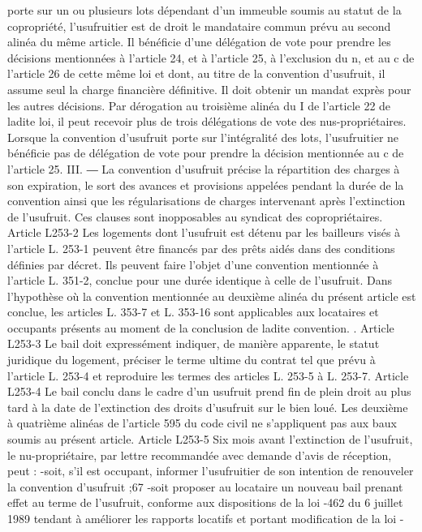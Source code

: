 \documentclass[11pt,a4paper]{report}
\begin{document}
porte sur un ou plusieurs lots dépendant d'un immeuble soumis au statut de la copropriété, l'usufruitier est de
droit le mandataire commun prévu au second alinéa du même article. Il bénéficie d'une délégation de vote pour
prendre les décisions mentionnées à l'article 24, et à l'article 25, à l'exclusion du n, et au c de l'article 26 de
cette même loi et dont, au titre de la convention d'usufruit, il assume seul la charge financière définitive. Il doit
obtenir un mandat exprès pour les autres décisions. Par dérogation au troisième alinéa du I de l'article 22 de
ladite loi, il peut recevoir plus de trois délégations de vote des nus-propriétaires. Lorsque la convention
d'usufruit porte sur l'intégralité des lots, l'usufruitier ne bénéficie pas de délégation de vote pour prendre la
décision mentionnée au c de l'article 25.
III. ― La convention d'usufruit précise la répartition des charges à son expiration, le sort des avances et
provisions appelées pendant la durée de la convention ainsi que les régularisations de charges intervenant après
l'extinction de l'usufruit. Ces clauses sont inopposables au syndicat des copropriétaires.
Article L253-2
Les logements dont l'usufruit est détenu par les bailleurs visés à l'article L. 253-1 peuvent être financés par des
prêts aidés dans des conditions définies par décret.
Ils peuvent faire l'objet d'une convention mentionnée à l'article L. 351-2, conclue pour une durée identique à
celle de l'usufruit.
Dans l'hypothèse où la convention mentionnée au deuxième alinéa du présent article est conclue, les articles L.
353-7 et L. 353-16 sont applicables aux locataires et occupants présents au moment de la conclusion de ladite
convention.
.
Article L253-3
Le bail doit expressément indiquer, de manière apparente, le statut juridique du logement, préciser le terme
ultime du contrat tel que prévu à l'article L. 253-4 et reproduire les termes des articles L. 253-5 à L. 253-7.
Article L253-4
Le bail conclu dans le cadre d'un usufruit prend fin de plein droit au plus tard à la date de l'extinction des droits
d'usufruit sur le bien loué.
Les deuxième à quatrième alinéas de l'article 595 du code civil ne s'appliquent pas aux baux soumis au présent
article.
Article L253-5
Six mois avant l'extinction de l'usufruit, le nu-propriétaire, par lettre recommandée avec demande d'avis de
réception, peut :
-soit, s'il est occupant, informer l'usufruitier de son intention de renouveler la convention d'usufruit ;67
-soit proposer au locataire un nouveau bail prenant effet au terme de l'usufruit, conforme aux dispositions de la
loi -462 du 6 juillet 1989 tendant à améliorer les rapports locatifs et portant modification de la loi -
\end{document}
